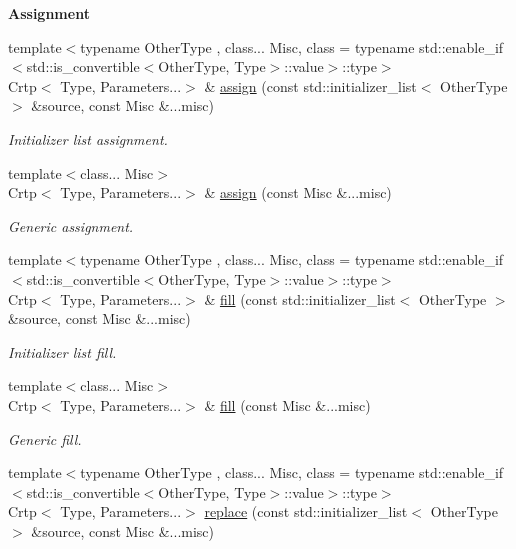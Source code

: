 \begin{Indent}{\bf Assignment}\par
\begin{DoxyCompactItemize}
\item 
{\footnotesize template$<$typename Other\-Type , class... Misc, class  = typename std\-::enable\-\_\-if$<$std\-::is\-\_\-convertible$<$\-Other\-Type, Type$>$\-::value$>$\-::type$>$ }\\Crtp$<$ Type, Parameters...$>$ \& \hyperlink{classmagrathea_1_1StaticVectorizer_aa026b0cb951858dfbebaf4df9d02dd28}{assign} (const std\-::initializer\-\_\-list$<$ Other\-Type $>$ \&source, const Misc \&...misc)
\begin{DoxyCompactList}\small\item\em Initializer list assignment. \end{DoxyCompactList}\item 
{\footnotesize template$<$class... Misc$>$ }\\Crtp$<$ Type, Parameters...$>$ \& \hyperlink{classmagrathea_1_1StaticVectorizer_aeecd6ce10ed87346885bf4c7aeef7ae6}{assign} (const Misc \&...misc)
\begin{DoxyCompactList}\small\item\em Generic assignment. \end{DoxyCompactList}\item 
{\footnotesize template$<$typename Other\-Type , class... Misc, class  = typename std\-::enable\-\_\-if$<$std\-::is\-\_\-convertible$<$\-Other\-Type, Type$>$\-::value$>$\-::type$>$ }\\Crtp$<$ Type, Parameters...$>$ \& \hyperlink{classmagrathea_1_1StaticVectorizer_aff1b6067431758a205c3cb71c38f6011}{fill} (const std\-::initializer\-\_\-list$<$ Other\-Type $>$ \&source, const Misc \&...misc)
\begin{DoxyCompactList}\small\item\em Initializer list fill. \end{DoxyCompactList}\item 
{\footnotesize template$<$class... Misc$>$ }\\Crtp$<$ Type, Parameters...$>$ \& \hyperlink{classmagrathea_1_1StaticVectorizer_abc085a9ed9cf363095eb42adf323b533}{fill} (const Misc \&...misc)
\begin{DoxyCompactList}\small\item\em Generic fill. \end{DoxyCompactList}\item 
{\footnotesize template$<$typename Other\-Type , class... Misc, class  = typename std\-::enable\-\_\-if$<$std\-::is\-\_\-convertible$<$\-Other\-Type, Type$>$\-::value$>$\-::type$>$ }\\Crtp$<$ Type, Parameters...$>$ \hyperlink{classmagrathea_1_1StaticVectorizer_ae322d5931112d91c3f24529e6c1e1559}{replace} (const std\-::initializer\-\_\-list$<$ Other\-Type $>$ \&source, const Misc \&...misc)

\end{DoxyCompactItemize}
\end{Indent}
